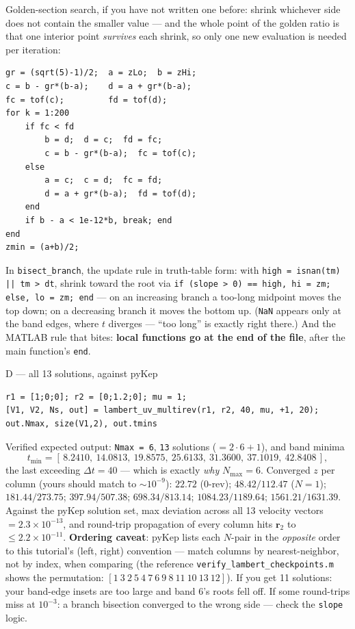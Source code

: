 \documentclass[11pt,letterpaper]{article}
\newcommand{\rvec}{\mathbf{r}}
\begin{document}
\begin{hint}
Golden-section search, if you have not written one before: shrink
whichever side does not contain the smaller value --- and the whole point
of the golden ratio is that one interior point \emph{survives} each
shrink, so only one new evaluation is needed per iteration:
\begin{verbatim}
gr = (sqrt(5)-1)/2;  a = zLo;  b = zHi;
c = b - gr*(b-a);    d = a + gr*(b-a);
fc = tof(c);         fd = tof(d);
for k = 1:200
    if fc < fd
        b = d;  d = c;  fd = fc;
        c = b - gr*(b-a);  fc = tof(c);
    else
        a = c;  c = d;  fc = fd;
        d = a + gr*(b-a);  fd = tof(d);
    end
    if b - a < 1e-12*b, break; end
end
zmin = (a+b)/2;
\end{verbatim}
In \texttt{bisect\_branch}, the update rule in truth-table form: with
\texttt{high = isnan(tm) || tm > dt}, shrink toward the root via
\texttt{if (slope > 0) == high, hi = zm; else, lo = zm; end} --- on an
increasing branch a too-long midpoint moves the top down; on a decreasing
branch it moves the bottom up. (\texttt{NaN} appears only at the band
edges, where $t$ diverges --- ``too long'' is exactly right there.) And
the MATLAB rule that bites: \textbf{local functions go at the end of the
file}, after the main function's \texttt{end}.
\end{hint}

\begin{checkpoint}{D --- all 13 solutions, against pyKep}
\begin{verbatim}
r1 = [1;0;0]; r2 = [0;1.2;0]; mu = 1;
[V1, V2, Ns, out] = lambert_uv_multirev(r1, r2, 40, mu, +1, 20);
out.Nmax, size(V1,2), out.tmins
\end{verbatim}
Verified expected output: \texttt{Nmax = 6}, \texttt{13} solutions
($= 2\cdot6+1$), and band minima
\[
  t_{\min} = [\,8.2410,\ 14.0813,\ 19.8575,\ 25.6133,\ 31.3600,\ 37.1019,\
  42.8408\,],
\]
the last exceeding $\Delta t = 40$ --- which is exactly \emph{why}
$N_{\max} = 6$. Converged $z$ per column (yours should match to
$\sim$$10^{-9}$): $22.72$ (0-rev); $48.42/112.47$ ($N{=}1$);
$181.44/273.75$; $397.94/507.38$; $698.34/813.14$; $1084.23/1189.64$;
$1561.21/1631.39$. Against the pyKep solution set, max deviation across
all 13 velocity vectors $= 2.3\times10^{-13}$, and round-trip propagation
of every column hits $\rvec_2$ to $\le 2.2\times10^{-11}$.
\textbf{Ordering caveat}: pyKep lists each $N$-pair in the \emph{opposite}
order to this tutorial's (left, right) convention --- match columns by
nearest-neighbor, not by index, when comparing (the reference
\texttt{verify\_lambert\_checkpoints.m} shows the permutation:
$[1\ 3\ 2\ 5\ 4\ 7\ 6\ 9\ 8\ 11\ 10\ 13\ 12]$).
If you get 11 solutions: your band-edge insets are too large and band 6's
roots fell off. If some round-trips miss at $10^{-3}$: a branch bisection
converged to the wrong side --- check the \texttt{slope} logic.
\end{checkpoint}
\end{document}

